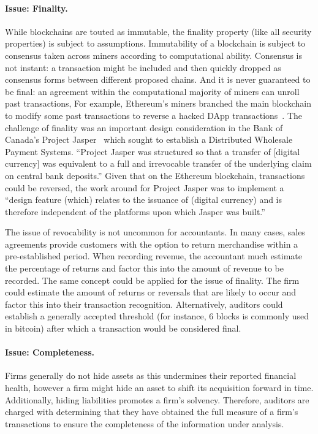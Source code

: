\paragraph{Issue: Finality.} While blockchains are touted as immutable, the finality property (like all security properties) is subject to assumptions. Immutability of a blockchain is subject to consensus taken across miners according to computational ability. Consensus is not instant: a transaction might be included and then quickly dropped as consensus forms between different proposed chains. And it is never guaranteed to be final: an agreement within the computational majority of miners can unroll past transactions, For example, Ethereum{'}s miners branched the main blockchain to modify some past transactions to reverse a hacked DApp transactions~\cite{dupont2017experiments}. The challenge of finality was an important design consideration in the Bank of Canada{'}s Project Jasper~\cite{chapman2017project} which sought to establish a Distributed Wholesale Payment Systems. ``Project Jasper was structured so that a transfer of [digital currency] was equivalent to a full and irrevocable transfer of the underlying claim on central bank deposits.'' Given that on the Ethereum blockchain, transactions could be reversed, the work around for Project Jasper was to implement a ``design feature (which) relates to the issuance of (digital currency) and is therefore independent of the platforms upon which Jasper was built.''

The issue of revocability is not uncommon for accountants. In many cases, sales agreements provide customers with the option to return merchandise within a pre-established period. When recording revenue, the accountant much estimate the percentage of returns and factor this into the amount of revenue to be recorded. The same concept could be applied for the issue of finality. The firm could estimate the amount of returns or reversals that are likely to occur and factor this into their transaction recognition. Alternatively, auditors could establish a generally accepted threshold (for instance, 6 blocks is commonly used in bitcoin) after which a transaction would be considered final.  %

\paragraph{Issue: Completeness.} Firms generally do not hide assets as this undermines their reported financial health, however a firm might hide an asset to shift its acquisition forward in time. Additionally, hiding liabilities promotes a firm{'}s solvency. Therefore, auditors are charged with determining that they have obtained the full measure of a firm{'}s transactions to ensure the completeness of the information under analysis.

